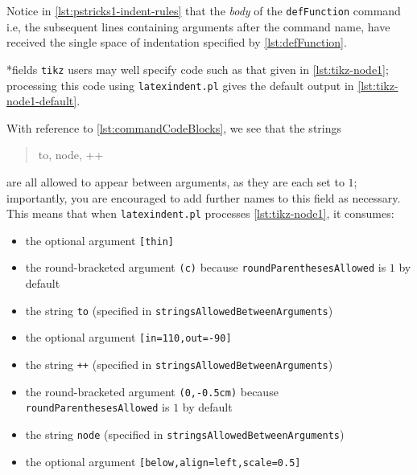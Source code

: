 	Notice in \cref{lst:pstricks1-indent-rules} that the \emph{body} of the \lstinline!defFunction! command i.e, the subsequent lines
	containing arguments after the command name, have received the single space of indentation specified by \cref{lst:defFunction}.

*{fields}
	\texttt{tikz} users may well specify code such as that given in \cref{lst:tikz-node1}; processing this code using
	\texttt{latexindent.pl} gives the default output in \cref{lst:tikz-node1-default}.

	\begin{minipage}{.45\textwidth}
	\end{minipage}
	\hfill
	\begin{minipage}{.45\textwidth}
	\end{minipage}

	With reference to \vref{lst:commandCodeBlocks}, we see that the strings
	\begin{quote}
		to, node, ++
	\end{quote}
	are all allowed to appear between arguments, as they are each set to $1$; importantly, you are encouraged to add further names
	to this field as necessary. This means that when \texttt{latexindent.pl}
	processes \cref{lst:tikz-node1}, it consumes:
	\begin{itemize}
		\item the optional argument \lstinline![thin]!
		\item the round-bracketed argument \lstinline!(c)! because \texttt{roundParenthesesAllowed} is $1$ by default
		\item the string \lstinline!to! (specified in \texttt{stringsAllowedBetweenArguments})
		\item the optional argument \lstinline![in=110,out=-90]!
		\item the string \lstinline!++! (specified in \texttt{stringsAllowedBetweenArguments})
		\item the round-bracketed argument \lstinline!(0,-0.5cm)! because \texttt{roundParenthesesAllowed} is $1$ by default
		\item the string \lstinline!node! (specified in \texttt{stringsAllowedBetweenArguments})
		\item the optional argument \lstinline![below,align=left,scale=0.5]!
	\end{itemize}

